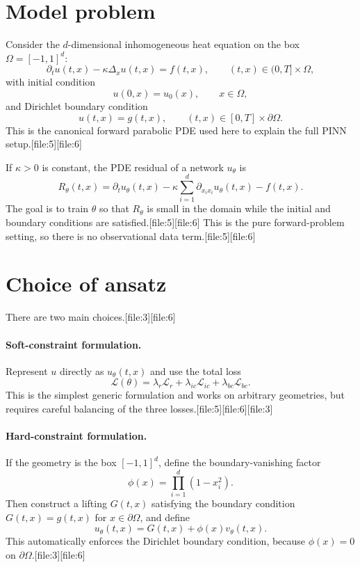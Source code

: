 \documentclass[11pt]{report}
\begin{document}
\section{Model problem}

Consider the \(d\)-dimensional inhomogeneous heat equation on the box \(\Omega=[-1,1]^d\):
\[
\partial_t u(t,x) - \kappa \Delta_x u(t,x) = f(t,x),
\qquad (t,x)\in (0,T]\times \Omega,
\]
with initial condition
\[
u(0,x)=u_0(x),
\qquad x\in \Omega,
\]
and Dirichlet boundary condition
\[
u(t,x)=g(t,x),
\qquad (t,x)\in [0,T]\times \partial\Omega.
\]
This is the canonical forward parabolic PDE used here to explain the full PINN setup.[file:5][file:6]

If \(\kappa>0\) is constant, the PDE residual of a network \(u_\theta\) is
\[
R_\theta(t,x)
=
\partial_t u_\theta(t,x)-\kappa \sum_{i=1}^d \partial_{x_i x_i}u_\theta(t,x)-f(t,x).
\]
The goal is to train \(\theta\) so that \(R_\theta\) is small in the domain while the initial and boundary conditions are satisfied.[file:5][file:6]  
This is the pure forward-problem setting, so there is no observational data term.[file:5][file:6]

\section{Choice of ansatz}

There are two main choices.[file:3][file:6]  

\paragraph{Soft-constraint formulation.}
Represent \(u\) directly as \(u_\theta(t,x)\) and use the total loss
\[
\mathcal{L}(\theta)
=
\lambda_r \mathcal{L}_r
+
\lambda_{ic}\mathcal{L}_{ic}
+
\lambda_{bc}\mathcal{L}_{bc}.
\]
This is the simplest generic formulation and works on arbitrary geometries, but requires careful balancing of the three losses.[file:5][file:6][file:3]

\paragraph{Hard-constraint formulation.}
If the geometry is the box \([-1,1]^d\), define the boundary-vanishing factor
\[
\phi(x)=\prod_{i=1}^d (1-x_i^2).
\]
Then construct a lifting \(G(t,x)\) satisfying the boundary condition \(G(t,x)=g(t,x)\) for \(x\in\partial\Omega\), and define
\[
u_\theta(t,x)=G(t,x)+\phi(x)v_\theta(t,x).
\]
This automatically enforces the Dirichlet boundary condition, because \(\phi(x)=0\) on \(\partial\Omega\).[file:3][file:6]
\end{document}

